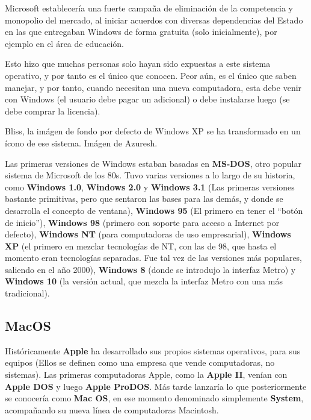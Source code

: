 Microsoft establecería una fuerte campaña de eliminación de la competencia y
monopolio del mercado, al iniciar acuerdos con diversas dependencias del Estado
en las que entregaban Windows de forma gratuita (solo inicialmente), por ejemplo
en el área de educación.

Esto hizo que muchas personas solo hayan sido expuestas a este sistema
operativo, y por tanto es el único que conocen. Peor aún, es el único que saben
manejar, y por tanto, cuando necesitan una nueva computadora, esta debe venir
con Windows (el usuario debe pagar un adicional) o debe instalarse luego (se
debe comprar la licencia).

{Bliss, la imágen de fondo por defecto de Windows XP se ha transformado en un
ícono de ese sistema.} {Imágen de Azuresh.}

Las primeras versiones de Windows estaban basadas en \textbf{MS-DOS}, otro
popular sistema de Microsoft de los 80s. Tuvo varias versiones a lo largo de su
historia, como \textbf{Windows 1.0}, \textbf{Windows 2.0} y \textbf{Windows 3.1}
(Las primeras versiones bastante primitivas, pero que sentaron las bases para
las demás, y donde se desarrolla el concepto de ventana), \textbf{Windows 95}
(El primero en tener el ``botón de inicio''), \textbf{Windows 98} (primero con
soporte para acceso a Internet por defecto), \textbf{Windows NT} (para
computadoras de uso empresarial), \textbf{Windows XP} (el primero en mezclar
tecnologías de NT, con las de 98, que hasta el momento eran tecnologías
separadas. Fue tal vez de las versiones más populares, saliendo en el año 2000),
\textbf{Windows 8} (donde se introdujo la interfaz Metro) y \textbf{Windows 10}
(la versión actual, que mezcla la interfaz Metro con una más tradicional).

\subsection*{MacOS}

Históricamente \textbf{Apple} ha desarrollado sus propios sistemas operativos,
para sus equipos (Ellos se definen como una empresa que vende computadoras, no
sistemas). Las primeras computadoras Apple, como la \textbf{Apple II}, venían
con \textbf{Apple DOS} y luego \textbf{Apple ProDOS}. Más tarde lanzaría lo que
posteriormente se conocería como \textbf{Mac OS}, en ese momento denominado
simplemente \textbf{System}, acompañando su nueva línea de computadoras
Macintosh.

